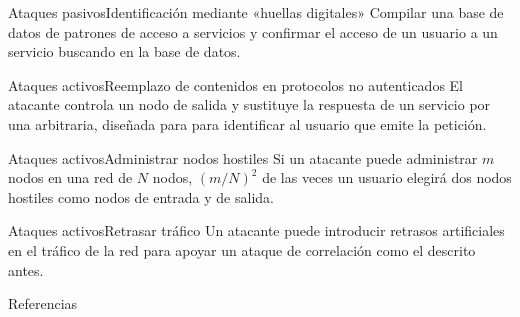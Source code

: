 \documentclass[spanish]{beamer}
\begin{document}
\begin{frame}{Ataques pasivos}{Identificación mediante «huellas digitales»}
  Compilar una base de datos de patrones de acceso a servicios y confirmar el acceso de
  un usuario a un servicio buscando en la base de datos.
\end{frame}

\begin{frame}{Ataques activos}{Reemplazo de contenidos en protocolos no autenticados}
  El atacante controla un nodo de salida y sustituye la respuesta de un servicio
  por una arbitraria, diseñada para para identificar al usuario que emite la
  petición.
\end{frame}

\begin{frame}{Ataques activos}{Administrar nodos hostiles}
 Si un atacante puede administrar $m$ nodos en una red de $N$ nodos,
 $\left(m/N\right)^2$ de las veces un usuario elegirá dos nodos
 hostiles como nodos de entrada y de salida.
\end{frame}

\begin{frame}{Ataques activos}{Retrasar tráfico}
Un atacante puede introducir retrasos artificiales en el tráfico de la red para
apoyar un ataque de correlación como el descrito antes.
\end{frame}

\begin{frame}[t,allowframebreaks]{Referencias}
  \printbibliography[heading=none]
\end{frame}
\end{document}

